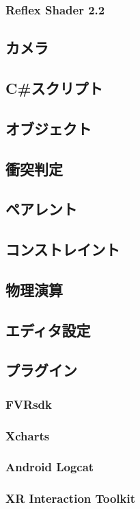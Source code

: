 \documentclass{ltjsreport}
\begin{document}
			\subsubsection{Reflex Shader 2.2}
		\subsection{カメラ}
		\subsection{C\#スクリプト}
		\subsection{オブジェクト}
		\subsection{衝突判定}
		\subsection{ペアレント}
		\subsection{コンストレイント}
		\subsection{物理演算}
		\subsection{エディタ設定}
		\subsection{プラグイン}
			\subsubsection{FVRsdk}
			\subsubsection{Xcharts}
			\subsubsection{Android Logcat}
			\subsubsection{XR Interaction Toolkit}
\end{document}
